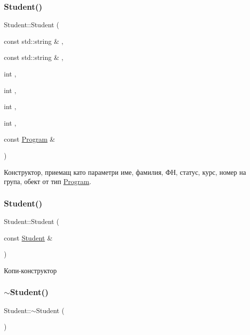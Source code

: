 \mbox{\label{class_student_a5c162823e7c932ba957b58215ee969c1}} 
\subsubsection{\texorpdfstring{Student()}{Student()}\hspace{0.1cm}{\footnotesize\ttfamily [3/4]}}
{\footnotesize\ttfamily Student\+::\+Student (\begin{DoxyParamCaption}\item[{const std\+::string \&}]{,  }\item[{const std\+::string \&}]{,  }\item[{int}]{,  }\item[{int}]{,  }\item[{int}]{,  }\item[{int}]{,  }\item[{const \hyperlink{class_program}{Program} \&}]{ }\end{DoxyParamCaption})}



Конструктор, приемащ като параметри име, фамилия, ФН, статус, курс, номер на група, обект от тип \hyperlink{class_program}{Program}. 

\mbox{\label{class_student_a4bc8fcbadabef3f7b81c40536f3713b1}} 
\subsubsection{\texorpdfstring{Student()}{Student()}\hspace{0.1cm}{\footnotesize\ttfamily [4/4]}}
{\footnotesize\ttfamily Student\+::\+Student (\begin{DoxyParamCaption}\item[{const \hyperlink{class_student}{Student} \&}]{ }\end{DoxyParamCaption})}



Копи-\/конструктор 

\mbox{\label{class_student_a92d33a757275b7a237910e974cd8bd0f}} 
\subsubsection{\texorpdfstring{$\sim$\+Student()}{~Student()}}
{\footnotesize\ttfamily Student\+::$\sim$\+Student (\begin{DoxyParamCaption}{ }\end{DoxyParamCaption})\hspace{0.3cm}{\ttfamily [default]}}



